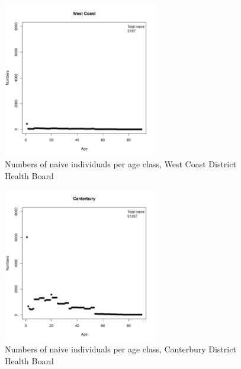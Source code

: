 \documentclass{article}
\begin{document}
\begin{figure}
     \begin{center}
     \includegraphics[width=0.6\textwidth]{dhb17.pdf}
     \end{center}
     \caption{Numbers of naive individuals per age class, West Coast District Health Board}
     \label{fig:WestCoast}
\end{figure}

\begin{figure}
     \begin{center}
     \includegraphics[width=0.6\textwidth]{dhb18.pdf}
     \end{center}
     \caption{Numbers of naive individuals per age class, Canterbury District Health Board}
     \label{fig:Canterbury}
\end{figure}
\end{document}
